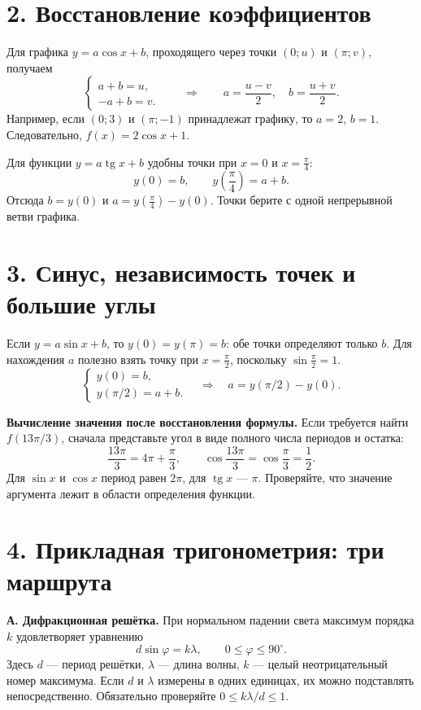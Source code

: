 \documentclass[a4paper,11pt]{article}
\newcommand{\key}[1]{\textcolor{accent}{\textbf{#1}}}
\begin{document}
\section*{2. Восстановление коэффициентов}
Для графика $y=a\cos x+b$, проходящего через точки $(0;u)$ и $(\pi;v)$, получаем
\[
\begin{cases}a+b=u,\\-a+b=v.\end{cases}
\qquad\Longrightarrow\qquad
\boxed{a=\frac{u-v}{2},\quad b=\frac{u+v}{2}}.
\]
Например, если $(0;3)$ и $(\pi;-1)$ принадлежат графику, то $a=2$, $b=1$. Следовательно, $f(x)=2\cos x+1$.

Для функции $y=a\operatorname{tg}x+b$ удобны точки при $x=0$ и $x=\frac\pi4$:
\[
y(0)=b,\qquad y\!\left(\frac\pi4\right)=a+b.
\]
Отсюда $b=y(0)$ и $a=y(\frac\pi4)-y(0)$. Точки берите с одной непрерывной ветви графика.

\clearpage
\section*{3. Синус, независимость точек и большие углы}
Если $y=a\sin x+b$, то $y(0)=y(\pi)=b$: обе точки определяют только $b$. Для нахождения $a$ полезно взять точку при $x=\frac\pi2$, поскольку $\sin\frac\pi2=1$.
\[
\begin{cases}y(0)=b,\\y(\pi/2)=a+b.\end{cases}
\quad\Longrightarrow\quad
 a=y(\pi/2)-y(0).
\]

\key{Вычисление значения после восстановления формулы.} Если требуется найти $f(13\pi/3)$, сначала представьте угол в виде полного числа периодов и остатка:
\[
\frac{13\pi}{3}=4\pi+\frac\pi3,
\qquad\cos\frac{13\pi}{3}=\cos\frac\pi3=\frac12.
\]
Для $\sin x$ и $\cos x$ период равен $2\pi$, для $\operatorname{tg}x$ --- $\pi$. Проверяйте, что значение аргумента лежит в области определения функции.

\section*{4. Прикладная тригонометрия: три маршрута}
\textbf{А. Дифракционная решётка.} При нормальном падении света максимум порядка $k$ удовлетворяет уравнению
\[
\boxed{d\sin\varphi=k\lambda},
\qquad 0\leq\varphi\leq90^\circ.
\]
Здесь $d$ --- период решётки, $\lambda$ --- длина волны, $k$ --- целый неотрицательный номер максимума. Если $d$ и $\lambda$ измерены в одних единицах, их можно подставлять непосредственно. Обязательно проверяйте $0\leq k\lambda/d\leq1$.
\end{document}
